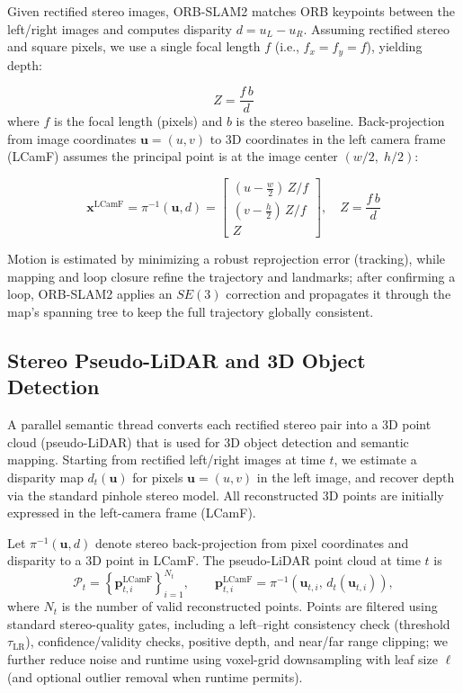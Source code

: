 \documentclass[letterpaper, 10 pt, conference]{IEEEtran}  %
\begin{document}
Given rectified stereo images, ORB-SLAM2 matches ORB keypoints between the left/right images and computes disparity
$d = u_L - u_R$. Assuming rectified stereo and square pixels, we use a single focal length $f$ (i.e., $f_x=f_y=f$), yielding depth:

\begin{equation}
Z=\frac{f\,b}{d}
\label{eq:stereo_depth}
\end{equation}
where $f$ is the focal length (pixels) and $b$ is the stereo baseline.
Back-projection from image coordinates $\mathbf{u}=(u,v)$ to 3D coordinates in the left camera frame (LCamF) assumes the principal point is at the image center $(w/2,\;h/2)$:

\begin{equation}
\mathbf{x}^{\mathrm{LCamF}}=
\pi^{-1}(\mathbf{u},d)=
\begin{bmatrix}
(u-\tfrac{w}{2})\,Z/f\\
(v-\tfrac{h}{2})\,Z/f\\
Z
\end{bmatrix},
\quad Z=\frac{f\,b}{d}
\label{eq:backproj}
\end{equation}

Motion is estimated by minimizing a robust reprojection error (tracking), while mapping and loop closure refine the trajectory and landmarks; after confirming a loop, ORB-SLAM2 applies an $SE(3)$ correction and propagates it through the map’s spanning tree to keep the full trajectory globally consistent.

\subsection{Stereo Pseudo-LiDAR and 3D Object Detection}
A parallel semantic thread converts each rectified stereo pair into a 3D point cloud (pseudo-LiDAR) that is used for 3D object detection and semantic mapping. Starting from rectified left/right images at time $t$, we estimate a disparity map $d_t(\mathbf{u})$ for pixels $\mathbf{u}=(u,v)$ in the left image, and recover depth via the standard pinhole stereo model. All reconstructed 3D points are initially expressed in the left-camera frame (LCamF).

Let $\pi^{-1}(\mathbf{u},d)$ denote stereo back-projection from pixel coordinates and disparity to a 3D point in LCamF. The pseudo-LiDAR point cloud at time $t$ is
\begin{equation}
\mathcal{P}_t=\left\{\mathbf{p}^{\mathrm{LCamF}}_{t,i}\right\}_{i=1}^{N_t},
\qquad
\mathbf{p}^{\mathrm{LCamF}}_{t,i}=\pi^{-1}\!\left(\mathbf{u}_{t,i},\, d_t(\mathbf{u}_{t,i})\right),
\label{eq:pseudolidar}
\end{equation}
where $N_t$ is the number of valid reconstructed points. Points are filtered using standard stereo-quality gates, including a left--right consistency check (threshold $\tau_{\mathrm{LR}}$), confidence/validity checks, positive depth, and near/far range clipping; we further reduce noise and runtime using voxel-grid downsampling with leaf size $\ell$ (and optional outlier removal when runtime permits).
\end{document}

